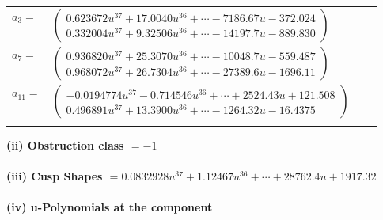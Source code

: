 \documentclass[1p]{elsarticle_modified}
\theoremstyle{definition}
\begin{document}
\begin{tabular}{m{7pt} m{180pt} m{7pt} m{180pt} }
\flushright $a_{3}=$&$\begin{pmatrix}0.623672 u^{37}+17.0040 u^{36}+\cdots-7186.67 u-372.024\\0.332004 u^{37}+9.32506 u^{36}+\cdots-14197.7 u-889.830\end{pmatrix}$ \\
\flushright $a_{7}=$&$\begin{pmatrix}0.936820 u^{37}+25.3070 u^{36}+\cdots-10048.7 u-559.487\\0.968072 u^{37}+26.7304 u^{36}+\cdots-27389.6 u-1696.11\end{pmatrix}$ \\
\flushright $a_{11}=$&$\begin{pmatrix}-0.0194774 u^{37}-0.714546 u^{36}+\cdots+2524.43 u+121.508\\0.496891 u^{37}+13.3900 u^{36}+\cdots-1264.32 u-16.4375\end{pmatrix}$\\&\end{tabular}
\flushleft \textbf{(ii) Obstruction class $= -1$}\\~\\
\flushleft \textbf{(iii) Cusp Shapes $= 0.0832928 u^{37}+1.12467 u^{36}+\cdots+28762.4 u+1917.32$}\\~\\
\newpage\renewcommand{\arraystretch}{1}
\flushleft \textbf{(iv) u-Polynomials at the component}\newline \\
\end{document}
